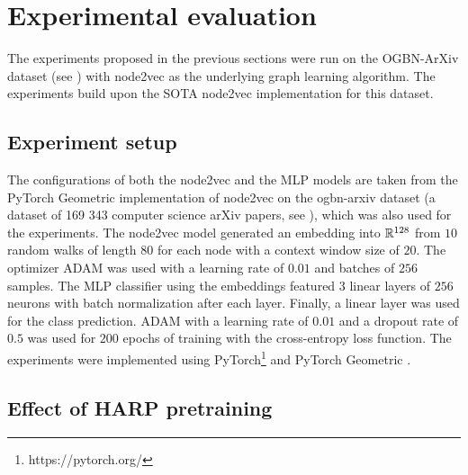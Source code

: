 \section{Experimental evaluation}\label{sec:experiments}

The experiments proposed in the previous sections were run on the OGBN-ArXiv dataset (see \cite{hu_open_2021}) with node2vec as the underlying graph learning algorithm. The experiments build upon the SOTA node2vec implementation for this dataset.

\subsection{Experiment setup}

The configurations of both the node2vec and the MLP models are taken from the PyTorch Geometric implementation of node2vec on the ogbn-arxiv dataset (a dataset of 169 343 computer science arXiv papers, see \cite{paszke_pytorch_2019}), which was also used for the experiments. The node2vec model generated an embedding into \( \mathbb{R}^{128} \) from \( 10 \) random walks of length \( 80 \) for each node with a context window size of \( 20 \). The optimizer ADAM \cite{kingma_adam:_2017} was used with a learning rate of \( 0.01 \) and batches of \( 256 \) samples. The MLP classifier using the embeddings featured \( 3 \) linear layers of \( 256 \) neurons with batch normalization after each layer. Finally, a linear layer was used for the class prediction. ADAM with a learning rate of \( 0.01 \) and a dropout rate of \( 0.5 \) was used for \( 200 \) epochs of training with the cross-entropy loss function. The experiments were implemented using PyTorch\footnote{https://pytorch.org/} and PyTorch Geometric \cite{paszke_pytorch_2019}.

\subsection{Effect of HARP pretraining}

